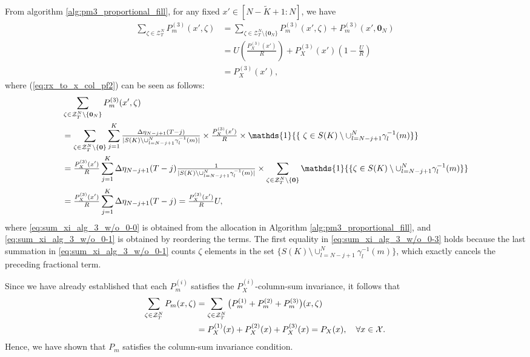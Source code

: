 \documentclass[11pt,letterpaper]{article}
\newcommand{\cX}{\mathcal{X}}
\newcommand{\cZ}{\mathcal{Z}}
\begin{document}
From algorithm \ref{alg:pm3_proportional_fill}, for any fixed $x' \in [N-\tilde{K}+1 : N]$, we have 
\begin{align}
    \sum_{\zeta \in \cZ^N_T} P_m^{(3)}(x',\zeta) & = \sum_{\zeta \in \cZ^N_T\setminus \{ \mathbf{0}_N\} } P_m^{(3)}(x',\zeta) + P_m^{(3)}(x',\mathbf{0}_N) \label{eq:rx_to_x_col_pf1}\\
    & = U\left(\frac{P_X^{(3)}(x')}{R} \right) + P_X^{(3)}(x')\left( 1- \frac{U}{R} \right)  \label{eq:rx_to_x_col_pf2}\\
    &= P_X^{(3)}(x'),
\end{align}
where (\ref{eq:rx_to_x_col_pf2}) can be seen as follows:
\begin{align}
    & \sum_{\zeta \in \cZ^N_T\setminus \{ \mathbf{0}_N\} } P_m^{(3)}(x',\zeta) \notag \\
    & =  \sum_{\zeta \in \cZ^N_T\setminus \{ \mathbf{0}\} } \sum_{j = 1}^K  \tfrac{\Delta\eta_{N-j+1}(T-j)}{|S(K)\setminus \cup_{l = N-j+1}^N \gamma_l^{-1}(m)|} \times \tfrac{P_X^{(3)}(x')}{R} \times \mathds{1} {\{ ~\zeta \in S(K)\setminus \cup_{l = N-j+1}^N \gamma_l^{-1}(m)\}} \label{eq:sum_xi_alg_3_w/o_0-0}\\
    & =   \tfrac{P_X^{(3)}(x')}{R} \sum_{j = 1}^K \Delta\eta_{N-j+1}(T-j)  \tfrac{1}{|S(K)\setminus \cup_{l = N-j+1}^N \gamma_l^{-1}(m)|} \times \sum_{\zeta \in \cZ^N_T\setminus \{ \mathbf{0}\} } \mathds{1} {\{\zeta \in S(K)\setminus \cup_{l = N-j+1}^N \gamma_l^{-1}(m)\}} \label{eq:sum_xi_alg_3_w/o_0-1}\\
    & = \tfrac{P_X^{(3)}(x')}{R} \sum_{j = 1}^K \Delta\eta_{N-j+1}(T-j)  =  \tfrac{P_X^{(3)}(x')}{R} U, \label{eq:sum_xi_alg_3_w/o_0-3}
\end{align}
where \eqref{eq:sum_xi_alg_3_w/o_0-0} is obtained from the allocation in Algorithm \ref{alg:pm3_proportional_fill}, and \eqref{eq:sum_xi_alg_3_w/o_0-1} is obtained by reordering the terms. The first equality in \eqref{eq:sum_xi_alg_3_w/o_0-3} holds because the last summation in \eqref{eq:sum_xi_alg_3_w/o_0-1} counts $\zeta$ elements in the set $\{S(K)\setminus \cup_{l = N-j+1}^N \gamma_l^{-1}(m) \}$, which exactly cancels the preceding fractional term.

Since we have already established that each $P_m^{(i)}$ satisfies the $P_X^{(i)}$-column-sum invariance, it follows that
\begin{align}
    \sum_{\zeta \in \cZ^N_T} P_m(x, \zeta) 
    &= \sum_{\zeta \in \cZ^N_T} \big(P_m^{(1)} + P_m^{(2)} + P_m^{(3)}\big)(x, \zeta) \notag \\
    &= P_X^{(1)}(x) + P_X^{(2)}(x) + P_X^{(3)}(x)= P_X(x), \quad \forall x \in \cX.
\end{align}
Hence, we have shown that $P_m$ satisfies the column-sum invariance condition.
\end{document}
